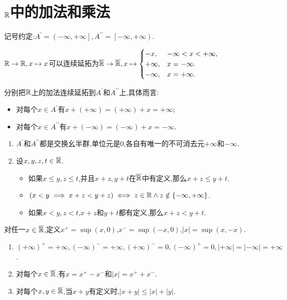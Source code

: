 \section{\texorpdfstring{$\mathbb{R}$}{R}中的加法和乘法}

记号约定:$A^{\prime}=\left(-\infty,+\infty\right],A^{\prime\prime}=\left[-\infty,+\infty\right)$.

\begin{proposition}{}{}
	$\mathbb{R}\to\mathbb{R},x\mapsto x$可以连续延拓为$\overline{\mathbb{R}}\to\overline{\mathbb{R}},x\mapsto
	\begin{cases}
		-x,&-\infty<x<+\infty,\\
		+\infty,&x=-\infty.\\
		-\infty,&x=+\infty.
	\end{cases}$
\end{proposition}

\begin{proposition}{}{}
	分别把$\mathbb{R}$上的加法连续延拓到$A^{\prime}$和$A^{\prime\prime}$上,具体而言:
	\begin{itemize}
		\item 对每个$x\in A^{\prime}$有$x+\left(+\infty\right)=\left(+\infty\right)+x=+\infty$;
		\item 对每个$x\in A^{\prime\prime}$有$x+\left(-\infty\right)=\left(-\infty\right)+x=-\infty$.
	\end{itemize}
	\begin{enumerate}
		\item $A^{\prime}$和$A^{\prime\prime}$都是交换幺半群,单位元是$0$,各自有唯一的不可消去元$+\infty$和$-\infty$.
		\item 设$x,y,z,t\in\overline{\mathbb{R}}$.
		\begin{itemize}
			\item 如果$x\leq y,z\leq t$,并且$x+z,y+t$在$\overline{\mathbb{R}}$中有定义,那么$x+z\leq y+t$.
			\item $\left(x<y\implies x+z<y+z\right)\iff z\in\mathbb{R}\wedge z\notin\left\{-\infty,+\infty\right\}$.
			\item 如果$x<y,z<t$,$x+z$和$y+t$都有定义,那么$x+z<y+t$.
		\end{itemize}
	\end{enumerate}
\end{proposition}

\begin{proposition}{}{}
	对任一$x\in\overline{\mathbb{R}}$,定义$x^{+}=\sup\left(x,0\right)$,$x^{-}=\sup\left(-x,0\right)$,$\left|x\right|=\sup\left(x,-x\right)$.
	\begin{enumerate}
		\item $\left(+\infty\right)^{+}=+\infty,\left(-\infty\right)^{-}=+\infty,\left(+\infty\right)^{-}=0,\left(-\infty\right)^{+}=0,\left|+\infty\right|=\left|-\infty\right|=+\infty$.
		\item 对每个$x\in\overline{\mathbb{R}}$,有$x=x^{+}-x^{-}$和$\left|x\right|=x^{+}+x^{-}$.
		\item 对每个$x,y\in\overline{\mathbb{R}}$,当$x+y$有定义时,$\left|x+y\right|\leqslant\left|x\right|+\left|y\right|$.
	\end{enumerate}
\end{proposition}


